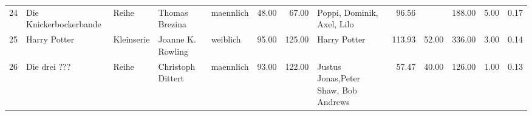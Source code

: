 \begin{sidewaystable}[ht]
\begin{center}
{\begin{tabular}{rllllrrlrrrrr}
  24 & Die Knickerbockerbande                                                                                                                                                                                                                                          & Reihe & Thomas Brezina                                                                                                                                                                                                                                                  & maennlich & 48.00 & 67.00 & Poppi, Dominik, Axel, Lilo                                                                                                                                                                                                                                      & 96.56 &  & 188.00 & 5.00 & 0.17 \\ 
  25 & Harry Potter                                                                                                                                                                                                                                                    & Kleinserie & Joanne K. Rowling                                                                                                                                                                                                                                               & weiblich & 95.00 & 125.00 & Harry Potter                                                                                                                                                                                                                                                    & 113.93 & 52.00 & 336.00 & 3.00 & 0.14 \\ 
  26 & Die drei ???                                                                                                                                                                                                                                                    & Reihe & Christoph Dittert                                                                                                                                                                                                                                               & maennlich & 93.00 & 122.00 & Justus Jonas,Peter Shaw, Bob Andrews                                                                                                                                                                                                                            & 57.47 & 40.00 & 126.00 & 1.00 & 0.13 \\ 

\end{tabular}}
\end{center}
\end{sidewaystable}
